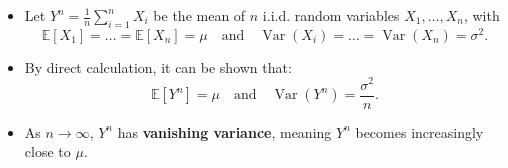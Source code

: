 \begin{itemize}
    \item Let \( Y^n = \frac{1}{n} \sum_{i=1}^n X_i \) be the mean of \(n\) i.i.d. random variables \( X_1, \dots, X_n \), with
    \[
    \mathbb{E}[X_1] = \dots = \mathbb{E}[X_n] = \mu \quad \text{and} \quad \operatorname{Var}(X_i) = \dots = \operatorname{Var}(X_n) = \sigma^2.
    \]

    \item By direct calculation, it can be shown that:
    \[
    \mathbb{E}[Y^n] = \mu \quad \text{and} \quad \operatorname{Var}(Y^n) = \frac{\sigma^2}{n}.
    \]

    \item As \( n \to \infty \), \( Y^n \) has \textbf{vanishing variance}, meaning \( Y^n \) becomes increasingly close to \( \mu \).
\end{itemize}

